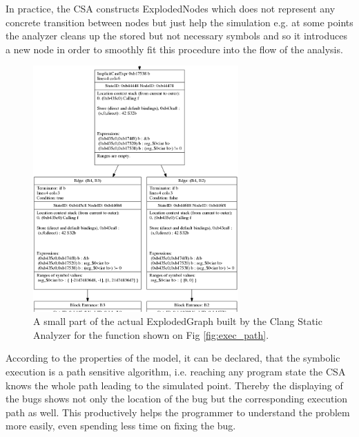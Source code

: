 In practice, the CSA constructs ExplodedNodes which does not represent any 
concrete transition between nodes but just help the simulation e.g. at some 
points the analyzer cleans up the stored but not necessary symbols and so it 
introduces a new node in order to smoothly fit this procedure into the flow of 
the analysis.

\begin{figure}[h]
	\centering
	\includegraphics[width=0.7\textwidth]{img/eg}
	\caption{A small part of the actual ExplodedGraph built by the Clang 
	Static Analyzer for the function shown on Fig \ref{fig:exec_path}.}
	\label{fig:exploded_graph2}
\end{figure}

According to the properties of the model, it can be declared, that the symbolic 
execution is a path sensitive algorithm, i.e. reaching any program state the 
CSA knows the whole path leading to the simulated point. Thereby the displaying 
of the bugs shows not only the location of the bug but the corresponding 
execution path as well. This productively helps the programmer to understand 
the problem more easily, even spending less time on fixing the bug.

